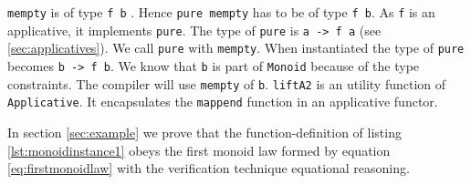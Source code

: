 \verb|mempty| is of type \verb|f b| . Hence \verb|pure mempty| has to be of type \verb|f b|.
As \verb|f| is an applicative, it implements \verb|pure|. The type of \verb|pure| is \verb|a -> f a| (see \ref{sec:applicatives}). We call \verb|pure| with \verb|mempty|. When instantiated the type of \verb|pure| becomes \verb|b -> f b|.  We know that \verb|b| is part of \verb|Monoid| because of the type constraints. The compiler will use \verb|mempty| of \verb|b|.  \verb|liftA2| is an utility function of \verb|Applicative|. It encapsulates the \verb|mappend| function in an applicative functor. 

In section \ref{sec:example} we prove that the \gls{function-definition} of listing \ref{lst:monoidinstance1} obeys the first monoid law formed by equation \ref{eq:firstmonoidlaw} with  the verification technique equational reasoning.



